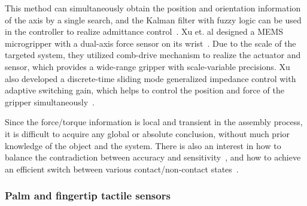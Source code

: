 \documentclass[journal,twoside,web]{ieeecolor}
\begin{document}
This method can simultaneously obtain the position and orientation information of the axis by a single search, and the Kalman filter with fuzzy logic can be used in the controller to realize admittance control~\cite{Luo2017}.
Xu et. al designed a MEMS microgripper with a dual-axis force sensor on its wrist~\cite{Xu2015,Xu2017}. Due to the scale of the targeted system, they utilized comb-drive mechanism to realize the actuator and sensor, which provides a wide-range gripper with scale-variable precisions. Xu also developed a discrete-time sliding mode generalized impedance control with adaptive switching gain, which helps to control the position and force of the gripper simultaneously~\cite{Xu2013}.

Since the force/torque information is local and transient in the assembly process, it is difficult to acquire any global or absolute conclusion, without much prior knowledge of the object and the system. 
There is also an interest in how to balance the contradiction between accuracy and sensitivity~\cite{Sun2015,Miyashita2018}, and how to achieve an efficient switch between various contact/non-contact states~\cite{Zhang2013,Gracia2018}.

\subsubsection{Palm and fingertip tactile sensors} 
\end{document}
